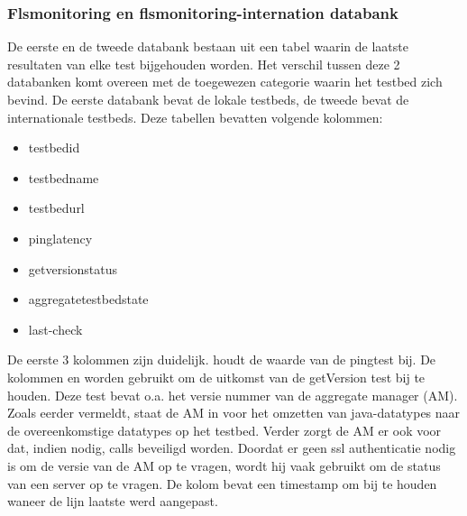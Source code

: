 \subsubsection{Flsmonitoring en flsmonitoring-internation databank}
\npar
De eerste en de tweede databank bestaan uit een tabel waarin de laatste resultaten van elke test bijgehouden worden. Het verschil tussen deze 2 databanken komt overeen met de toegewezen categorie waarin het testbed zich bevind. De eerste databank bevat de lokale testbeds, de tweede bevat de internationale testbeds. Deze tabellen bevatten volgende kolommen:
\begin{itemize}
\item testbedid
\item testbedname
\item testbedurl
\item pinglatency
\item getversionstatus
\item aggregatetestbedstate
\item last-check
\end{itemize}
 De eerste 3 kolommen zijn duidelijk.  houdt de waarde van de pingtest bij.
De kolommen  en  worden gebruikt om de uitkomst van de getVersion test bij te houden. Deze test bevat o.a. het versie nummer van de aggregate manager (AM). Zoals eerder vermeldt, staat de AM in voor het omzetten van java-datatypes naar de overeenkomstige datatypes op het testbed. Verder zorgt de AM er ook voor dat, indien nodig, calls beveiligd worden. Doordat er geen ssl authenticatie nodig is om de versie van de AM op te vragen, wordt hij vaak gebruikt om de status van een server op te vragen. De kolom  bevat een timestamp om bij te houden waneer de lijn laatste werd aangepast.
